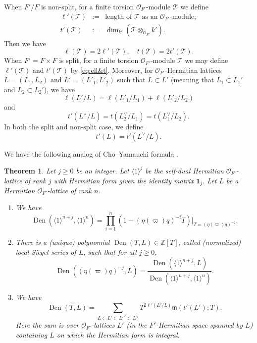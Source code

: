\documentclass[reqno]{amsart}
\numberwithin{equation}{section}
\newcommand{\iden}{\langle1\rangle}
\DeclareMathOperator{\Den}{Den}
\newcommand\ot{\otimes}
\newcommand\cO{\mathcal{O}}
\newcommand\cT{\mathcal{T}}
\newcommand\fm{\mathfrak{m}}
\newtheorem{thm}{Theorem}[section]
\theoremstyle{remark}
\numberwithin{equation}{section}
\begin{document}
When $F'/F$ is non-split, for a finite torsion $\cO_{F'}$-module $\cT$ we define 
\begin{eqnarray*}
\label{def ell'}\ell'(\cT)&:=&\mbox{length of $\cT$ as an $\cO_{F'}$-module};\\
\label{def t'}t'(\cT)&:=&\dim_{k'}(\cT\ot_{\cO_{F'}}k').
\end{eqnarray*}
 Then we have 
\begin{equation}\label{eq:ell&t}
\ell(\cT)=2\ell'(\cT),\quad t(\cT)=2t'(\cT).
\end{equation}
When $F'=F\times F$ is split, for a finite torsion $\cO_{F'}$-module $\cT$ we may define $\ell'(\cT)$ and $t'(\cT)$ by \eqref{eq:ell&t}. Moreover, for  $\cO_{F'}$-Hermitian lattices $L=(L_1,L_2)$ and $L'=(L'_1,L'_2)$ such that $L\subset L'$ (meaning that $L_1 \subset L_1'$ and $L_2 \subset L_2'$), we have 
$$
\ell(L'/L)=\ell(L'_1/L_1)+\ell(L'_2/L_2)
$$
and
$$
t'(L^\vee/L)=t(L_2^{\vee}/L_1)=t(L_1^{\vee}/L_2).
$$
In both the split and non-split case, we define 
$$
t'(L)=t'(L^\vee/L).
$$


We have the following analog of Cho--Yamauchi formula \cite{CY}.
\begin{thm}\label{th:CY} 
Let $j\ge0$ be an integer. Let $\iden^j$ be the self-dual Hermitian $\cO_{F'}$-lattice of rank $j$ with Hermitian form given the identity matrix $\mathbf{1}_j$. Let $L$ be a Hermitian $\cO_{F'}$-lattice of rank $n$. 
  \begin{enumerate}
  \item We have
\begin{equation}
  \label{eq: iden}
\Den(\iden^{n+j}, \iden^n)=\prod_{i=1}^n(1-(\eta(\varpi)q)^{-i}T)\bigg|_{T= (\eta(\varpi)q)^{-j}}.
\end{equation}
\item
There is  a (unique) polynomial $\Den(T,L)\in \mathbb{Z}[T]$, called  (normalized) \emph{local Siegel series} of $L$,  such that for all $j\geq 0$,
$$\Den((\eta(\varpi) q)^{-j},L)=\frac{\Den(\iden^{n+j}, L)}{\Den(\iden^{n+j}, \iden^n)}.$$ 
  \item We have
\begin{equation}\label{eq:CY}
\Den(T,L) = \sum_{L \subset L '\subset L'^{\vee} \subset L^{\vee}} T^{2\ell'(L'/L)}\fm(  t'(L');T). 
\end{equation}
Here the sum is over $\cO_{F'}$-lattices $L'$ (in the $F'$-Hermitian space spanned by $L$) containing $L$ on which the Hermitian form is integral.
\end{enumerate}
\end{thm}
\end{document}
